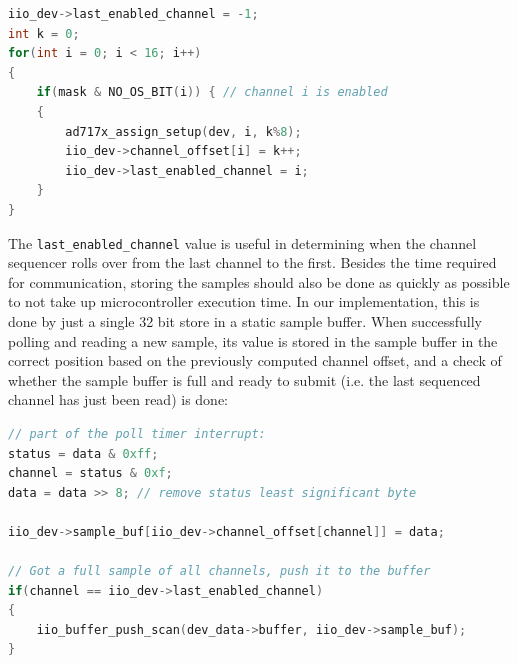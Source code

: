 \documentclass{thesis}
\newcommand{\Hz}{\unit{\hertz}}
\begin{document}
\begin{lstlisting}[language=C]
iio_dev->last_enabled_channel = -1;
int k = 0;
for(int i = 0; i < 16; i++)
{
    if(mask & NO_OS_BIT(i)) { // channel i is enabled
    {
        ad717x_assign_setup(dev, i, k%8);
        iio_dev->channel_offset[i] = k++;
        iio_dev->last_enabled_channel = i;
    }
}
\end{lstlisting}

The \texttt{last\_enabled\_channel} value is useful in determining when the channel sequencer rolls over from the last channel to the first. Besides the time required for communication, storing the samples should also be done as quickly as possible to not take up microcontroller execution time. In our implementation, this is done by just a single 32 bit store in a static sample buffer. When successfully polling and reading a new sample, its value is stored in the sample buffer in the correct position based on the previously computed channel offset, and a check of whether the sample buffer is full and ready to submit (i.e. the last sequenced channel has just been read) is done:

\begin{lstlisting}[language=C]
// part of the poll timer interrupt:
status = data & 0xff;
channel = status & 0xf;
data = data >> 8; // remove status least significant byte

iio_dev->sample_buf[iio_dev->channel_offset[channel]] = data;
    
// Got a full sample of all channels, push it to the buffer
if(channel == iio_dev->last_enabled_channel)
{
    iio_buffer_push_scan(dev_data->buffer, iio_dev->sample_buf);
}
\end{lstlisting}


\end{document}
